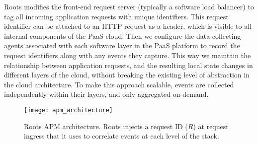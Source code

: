 Roots modifies the front-end request server (typically a software load
balancer) 
to tag all incoming application requests with unique identifiers.
This request identifier can be attached to an HTTP request as a header, which is visible to all 
internal components of the PaaS cloud. Then we configure the data collecting
agents associated with each software layer in the PaaS 
platform to record the request identifiers along with any events they capture. 
This way we maintain the relationship between application requests, and the resulting
local state changes in different layers of the cloud, without breaking the existing level
of abstraction in the cloud architecture. 
To make this approach scalable, events are collected independently within their layers, and only
aggregated on-demand.
%
%
\begin{figure}
\centering
\texttt{[image: apm\_architecture]}
\caption{Roots APM architecture.  Roots injects a request ID ($R$) at request
ingress that it uses to correlate events at each level of the stack.}
\label{fig:apm_architecture}
\end{figure}
%

